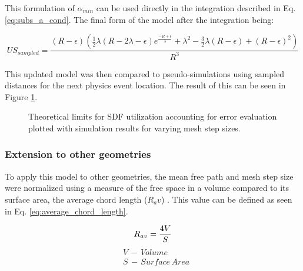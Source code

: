 This formulation of $\alpha_{min}$ can be used directly in the integration described
in Eq. \ref{eq:subs_a_cond}. The final form of the model after the integration being:

$$ US_{sampled} = \frac{(R-\epsilon) (\frac{1}{2} \lambda ( R - 2\lambda - \epsilon ) e^{\frac{-R + \epsilon}{\lambda}} +
\lambda^{2} - \frac{3}{2}\lambda(R - \epsilon) + (R-\epsilon)^{2})}{R^3}$$




This updated model was then compared to pseudo-simulations using sampled
distances for the next physics event location. The result of this can be seen in
Figure \ref{fig:sdf_util_sampled_distance_w_error}.

\begin{figure}[ht]
  \centering
  {\textwidth}
  \caption{Theoretical limits for SDF utilization accounting for error
    evaluation plotted with simulation results for varying mesh step sizes.}
  \label{fig:sdf_util_sampled_distance_w_error}
\end{figure}

\subsubsection{Extension to other geometries}

To apply this model to other geometries, the mean free path and mesh step size
were normalized using a measure of the free space in a volume compared to its
surface area, the average chord length ($R_av$) \cite{Wigner_1981}.  This value
can be defined as seen in Eq. \ref{eq:average_chord_length}.

\begin{equation}
\centering
 R_{av} = \frac{4V}{S}
 \label{eq:average_chord_length}
\end{equation}
\begin{align*}
 &V \, - \, Volume \\
 &S \, - \, Surface \, Area
\end{align*}

